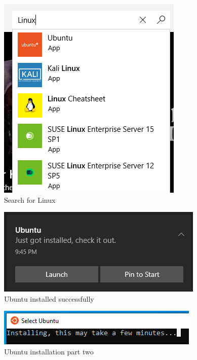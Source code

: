 \documentclass[letter,11pt]{article}
\begin{document}
\begin{figure}
    \centering
    \includegraphics[scale=0.6]{Images/WSL/a.png}
    \caption{Search for Linux}
    \label{fig:wslsearchlinux}
\end{figure}

\begin{figure}
    \centering
    \includegraphics[scale=0.6]{Images/WSL/b.png}
    \caption{Ubuntu installed successfully}
    \label{fig:wslinstalled}
\end{figure}

\begin{figure}
    \centering
    \includegraphics[scale=0.8]{Images/WSL/c.png}
    \caption{Ubuntu installation part two}
    \label{fig:wslinstallparttwo}
\end{figure}
\end{document}
